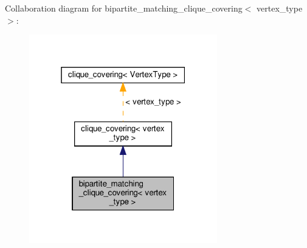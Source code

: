 Collaboration diagram for bipartite\+\_\+matching\+\_\+clique\+\_\+covering$<$ vertex\+\_\+type $>$\+:
\nopagebreak
\begin{figure}[H]
\begin{center}
\leavevmode
\includegraphics[width=232pt]{df/d72/classbipartite__matching__clique__covering__coll__graph}
\end{center}
\end{figure}
